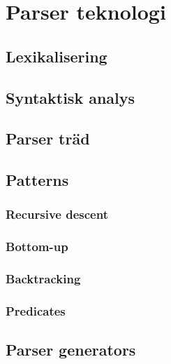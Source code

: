 \section{Parser teknologi}

\subsection{Lexikalisering}

\subsection{Syntaktisk analys}
\subsection{Parser träd}

\subsection{Patterns}
\subsubsection{Recursive descent}
\subsubsection{Bottom-up}
\subsubsection{Backtracking}
\subsubsection{Predicates}

\subsection{Parser generators}
